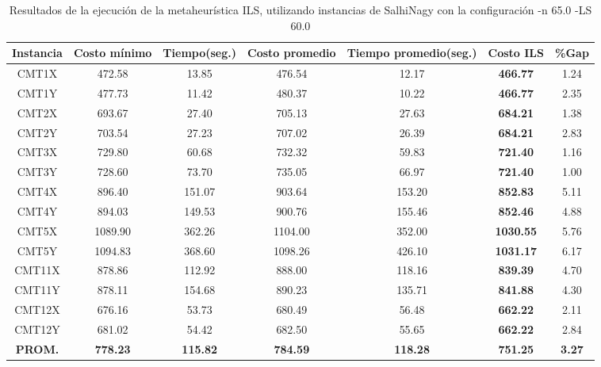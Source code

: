 \begin{table}[ht]
\caption{Resultados de la ejecución de la metaheurística ILS, utilizando instancias de SalhiNagy con la configuración -n 65.0 -LS 60.0}
\centering
\small
\begin{tabular}{c c c c c c c}
\hline\hline
Instancia & Costo mínimo & Tiempo(seg.) & Costo promedio & Tiempo promedio(seg.) & Costo ILS & \%Gap \\ [0.5ex]
\hline
CMT1X & 472.58 & 13.85 & 
476.54 & 12.17 & \bf{466.77} & 
1.24\\CMT1Y & 477.73 & 11.42 & 
480.37 & 10.22 & \bf{466.77} & 
2.35\\CMT2X & 693.67 & 27.40 & 
705.13 & 27.63 & \bf{684.21} & 
1.38\\CMT2Y & 703.54 & 27.23 & 
707.02 & 26.39 & \bf{684.21} & 
2.83\\CMT3X & 729.80 & 60.68 & 
732.32 & 59.83 & \bf{721.40} & 
1.16\\CMT3Y & 728.60 & 73.70 & 
735.05 & 66.97 & \bf{721.40} & 
1.00\\CMT4X & 896.40 & 151.07 & 
903.64 & 153.20 & \bf{852.83} & 
5.11\\CMT4Y & 894.03 & 149.53 & 
900.76 & 155.46 & \bf{852.46} & 
4.88\\CMT5X & 1089.90 & 362.26 & 
1104.00 & 352.00 & \bf{1030.55} & 
5.76\\CMT5Y & 1094.83 & 368.60 & 
1098.26 & 426.10 & \bf{1031.17} & 
6.17\\CMT11X & 878.86 & 112.92 & 
888.00 & 118.16 & \bf{839.39} & 
4.70\\CMT11Y & 878.11 & 154.68 & 
890.23 & 135.71 & \bf{841.88} & 
4.30\\CMT12X & 676.16 & 53.73 & 
680.49 & 56.48 & \bf{662.22} & 
2.11\\CMT12Y & 681.02 & 54.42 & 
682.50 & 55.65 & \bf{662.22} & 
2.84\\\bf{PROM.} & 
\bf{778.23} & \bf{115.82} & \bf{784.59} & \bf{118.28} & \bf{751.25} & \bf{3.27}\\[1ex]\hline
\end{tabular}
\label{table:nonlin}
\end{table} \clearpage

